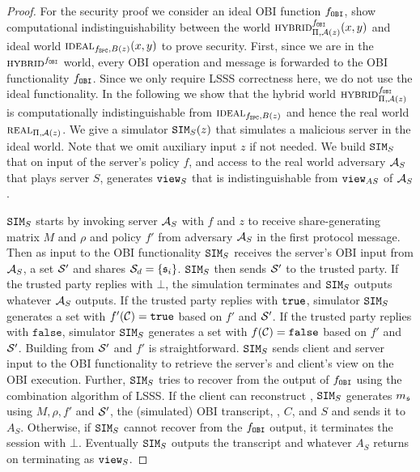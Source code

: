 \begin{proof}
For the security proof we consider an ideal \ac{OBI} function $f_\mathtt{OBI}$, \ie show computational indistinguishability between the world $\HYBRID^{f_\OBI}_{\Pi, \cA(z)} (x, y)$ and ideal world $\IDEAL_{f_\SPC, B(z)}(x, y)$ to prove security. 
First, since we are in the $\HYBRID^{f_\OBI}$ world, every \ac{OBI} operation and message is forwarded to the \ac{OBI} functionality $f_\mathtt{OBI}$.
Since we only require \ac{LSSS} correctness here, we do not use the ideal functionality.
In the following we show that the hybrid world $\HYBRID^{f_\OBI}_{\Pi, \cA(z)}$ is computationally indistinguishable from $\IDEAL_{f_\SPC, B(z)}$ and hence the real world $\REAL_{\Pi, \cA(z)}$. 
We give a simulator $\mathtt{SIM}_S(z)$ that simulates a malicious server in the ideal world. 
Note that we omit auxiliary input $z$ if not needed. 
We build $\mathtt{SIM}_S$ that on input of the server's policy $f$, and access to the real world adversary $\mathcal{A}_S$ that plays server $S$, generates $\mathtt{view}_S$ that is indistinguishable from $\mathtt{view}_{AS}$ of $\mathcal{A}_S$.

$\mathtt{SIM}_S$ starts by invoking server $\mathcal{A}_S$ with $f$ and $z$ to receive share-generating matrix $M$ and $\rho$ and policy $f'$ from adversary $\mathcal{A}_S$ in the first protocol message. 
Then as input to the \ac{OBI} functionality $\mathtt{SIM}_S$ receives the server's \ac{OBI} input  from $\mathcal{A}_S$, \ie a set $\mathcal{S}'$ and shares $\mathcal{S}_d=\{\mathfrak{s}_i\}$. 
$\mathtt{SIM}_S$ then sends $\mathcal{S}'$ to the trusted party. 
If the trusted party replies with $\bot$, the simulation terminates and $\mathtt{SIM}_S$ outputs whatever $\mathcal{A}_S$ outputs. 
If the trusted party replies with $\mathtt{true}$, 
simulator $\mathtt{SIM}_S$ generates a set \cC with $f'(\mathcal{C})=\mathtt{true}$ based on $f'$ and $\mathcal{S}'$. 
If the trusted party replies with $\texttt{false}$, simulator $\mathtt{SIM}_S$ generates a set \cC with $f(\mathcal{C})=\texttt{false}$ based on $f'$ and $\mathcal{S}'$. 
Building \cC from $\mathcal{S}'$ and $f'$ is straightforward. 
$\mathtt{SIM}_S$ sends client and server input to the \ac{OBI} functionality to retrieve the server's and client's view on the \ac{OBI} execution. 
Further, $\mathtt{SIM}_S$ tries to recover \secret from the output of $f_\mathtt{OBI}$ using the combination algorithm of \ac{LSSS}. 
If the client can reconstruct \secret, $\mathtt{SIM}_S$ generates $m_\mathfrak{s}$ using $M, \rho, f'$ and $\mathcal{S}'$, the (simulated) \ac{OBI} transcript, \secret, $C$, and $S$ and sends it to $A_S$. 
Otherwise, if $\mathtt{SIM}_S$ cannot recover \secret from the $f_\mathtt{OBI}$ output, it terminates the session with $\bot$.
Eventually $\mathtt{SIM}_S$ outputs the transcript and whatever $A_S$ returns on terminating as $\mathtt{view}_S$.


\end{proof}
